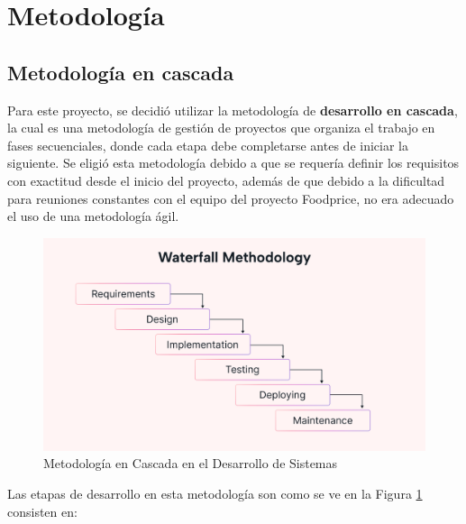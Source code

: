 

\section{Metodolog\'ia}

\subsection{Metodolog\'ia en cascada}

\noindent Para este proyecto, se decidi\'o utilizar la metodolog\'ia de \textbf{desarrollo en cascada},  la cual es una metodolog\'ia de gesti\'on de proyectos que organiza el trabajo en fases secuenciales, donde cada etapa debe completarse antes de iniciar la siguiente\cite{asanaQueEsMetodologia}. Se eligi\'o esta metodolog\'ia debido a que se requer\'ia definir los requisitos con exactitud desde el inicio del proyecto, adem\'as de que debido a la dificultad para reuniones constantes con el equipo del proyecto Foodprice, no era adecuado el uso de una metodolog\'ia \'agil. 


\begin{figure}[H]
    \centering
    \includegraphics[width=15cm]{img/metodologia/metodologia waterfall.png}
    \caption{Metodolog\'ia en Cascada en el Desarrollo de Sistemas}
    \label{fig:metodologia_waterfall}
\end{figure}


\noindent Las etapas de desarrollo en esta metodolog\'ia son como se ve en la Figura \ref{fig:metodologia_waterfall} consisten en:

